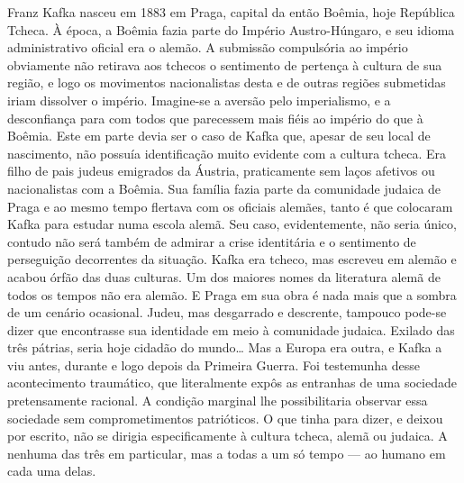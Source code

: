 Franz Kafka nasceu em 1883 em Praga, capital da então Boêmia, hoje
República Tcheca. À época, a Boêmia fazia parte do Império
Austro-Húngaro, e seu idioma administrativo oficial era o alemão. A
submissão compulsória ao império obviamente não retirava aos tchecos o
sentimento de pertença à cultura de sua região, e logo os movimentos
nacionalistas desta e de outras regiões submetidas iriam dissolver o
império. Imagine-se a aversão pelo imperialismo, e a desconfiança
para com todos que parecessem mais fiéis ao império do que à Boêmia.
Este em parte devia ser o caso de Kafka que, apesar de seu local de
nascimento, não possuía identificação muito evidente com a cultura
tcheca. Era filho de pais judeus emigrados da Áustria, praticamente sem
laços afetivos ou nacionalistas com a Boêmia. Sua família fazia parte
da comunidade judaica de Praga e ao mesmo tempo flertava com os
oficiais alemães, tanto é que colocaram Kafka para estudar numa escola
alemã. Seu caso, evidentemente, não seria único, contudo não será
também de admirar a crise identitária e o sentimento de perseguição
decorrentes da situação. Kafka era tcheco, mas escreveu em alemão e
acabou órfão das duas culturas. Um dos maiores nomes da literatura
alemã de todos os tempos não era alemão. E Praga em sua obra é nada
mais que a sombra de um cenário ocasional. Judeu, mas desgarrado e
descrente, tampouco pode-se dizer que encontrasse sua identidade em
meio à comunidade judaica. Exilado das três pátrias, seria hoje cidadão
do mundo\ldots{} Mas a Europa era outra, e Kafka a viu antes, durante e logo
depois da Primeira Guerra. Foi testemunha desse acontecimento
traumático, que literalmente expôs as entranhas de uma sociedade
pretensamente racional. A condição marginal lhe possibilitaria observar
essa sociedade sem comprometimentos patrióticos. O que tinha para
dizer, e deixou por escrito, não se dirigia especificamente à cultura
tcheca, alemã ou judaica. A nenhuma das três em particular, mas a todas
a um só tempo --- ao humano em cada uma delas.

